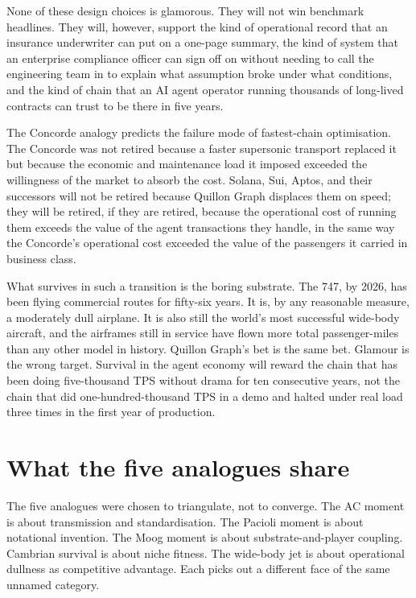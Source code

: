 \documentclass[11pt,a4paper]{article}
\begin{document}
None of these design choices is glamorous. They will not win benchmark
headlines. They will, however, support the kind of operational record
that an insurance underwriter can put on a one-page summary, the kind of
system that an enterprise compliance officer can sign off on without
needing to call the engineering team in to explain what assumption broke
under what conditions, and the kind of chain that an AI agent operator
running thousands of long-lived contracts can trust to be there in five
years.

The Concorde analogy predicts the failure mode of fastest-chain
optimisation. The Concorde was not retired because a faster supersonic
transport replaced it but because the economic and maintenance load it
imposed exceeded the willingness of the market to absorb the cost.
Solana, Sui, Aptos, and their successors will not be retired because
Quillon Graph displaces them on speed; they will be retired, if they are
retired, because the operational cost of running them exceeds the value
of the agent transactions they handle, in the same way the Concorde's
operational cost exceeded the value of the passengers it carried in
business class.

What survives in such a transition is the boring substrate. The 747, by
2026, has been flying commercial routes for fifty-six years. It is, by
any reasonable measure, a moderately dull airplane. It is also still the
world's most successful wide-body aircraft, and the airframes still in
service have flown more total passenger-miles than any other model in
history. Quillon Graph's bet is the same bet. Glamour is the wrong
target. Survival in the agent economy will reward the chain that has
been doing five-thousand TPS without drama for ten consecutive years,
not the chain that did one-hundred-thousand TPS in a demo and halted
under real load three times in the first year of production.

\section{What the five analogues share}\label{sec:share}

The five analogues were chosen to triangulate, not to converge. The AC
moment is about transmission and standardisation. The Pacioli moment is
about notational invention. The Moog moment is about
substrate-and-player coupling. Cambrian survival is about niche fitness.
The wide-body jet is about operational dullness as competitive
advantage. Each picks out a different face of the same unnamed category.
\end{document}
